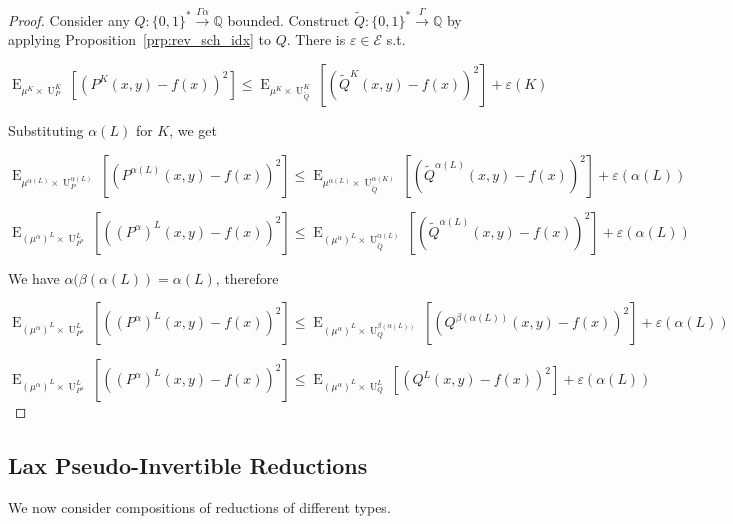 \documentclass{article}
\numberwithin{equation}{section}
\theoremstyle{definition}
\theoremstyle{plain}
\newcommand{\Bool}{\{0,1\}}
\newcommand{\Words}{{\Bool^*}}
\DeclareMathOperator{\E}{E}
\DeclareMathOperator{\Un}{U}
\newcommand{\Rats}{\mathbb{Q}}
\newcommand{\Fall}{\mathcal{E}}
\newcommand{\Scheme}{\xrightarrow{\Gamma}}
\begin{document}
\begin{proof}

Consider any ${Q: \Words \xrightarrow{\Gamma \alpha} \Rats}$ bounded. Construct ${\tilde{Q}: \Words \Scheme \Rats}$ by applying Proposition~\ref{prp:rev_sch_idx} to ${Q}$. There is ${\varepsilon \in \Fall}$ s.t.

\[\E_{\mu^{K} \times \Un_P^K}[(P^K(x,y)-f(x))^2] \leq \E_{\mu^{K} \times \Un_{\tilde{Q}}^K}[(\tilde{Q}^K(x,y)-f(x))^2] + \varepsilon(K)\]

Substituting ${\alpha(L)}$ for ${K}$, we get

\[\E_{\mu^{\alpha(L)} \times \Un_P^{\alpha(L)}}[(P^{\alpha(L)}(x,y)-f(x))^2] \leq \E_{\mu^{\alpha(L)} \times \Un_{\tilde{Q}}^{\alpha(K)}}[(\tilde{Q}^{\alpha(L)}(x,y)-f(x))^2] + \varepsilon({\alpha(L)})\]

\[\E_{(\mu^\alpha)^{L} \times \Un_{P^\alpha}^L}[((P^\alpha)^L(x,y)-f(x))^2] \leq \E_{(\mu^\alpha)^{L} \times \Un_{\tilde{Q}}^{\alpha(L)}}[(\tilde{Q}^{\alpha(L)}(x,y)-f(x))^2] + \varepsilon(\alpha(L))\]

We have ${\alpha(\beta(\alpha(L))=\alpha(L)}$, therefore

\[\E_{(\mu^\alpha)^{L} \times \Un_{P^\alpha}^L}[((P^\alpha)^L(x,y)-f(x))^2] \leq \E_{(\mu^\alpha)^{L} \times \Un_Q^{\beta(\alpha(L))}}[(Q^{\beta(\alpha(L))}(x,y)-f(x))^2] + \varepsilon(\alpha(L))\]

\[\E_{(\mu^\alpha)^{L} \times \Un_{P^\alpha}^L}[((P^\alpha)^L(x,y)-f(x))^2] \leq \E_{(\mu^\alpha)^{L} \times \Un_Q^L}[(Q^L(x,y)-f(x))^2] + \varepsilon(\alpha(L))\]
%
\end{proof}

\subsection{Lax Pseudo-Invertible Reductions}

We now consider compositions of reductions of different types.

\end{document}

